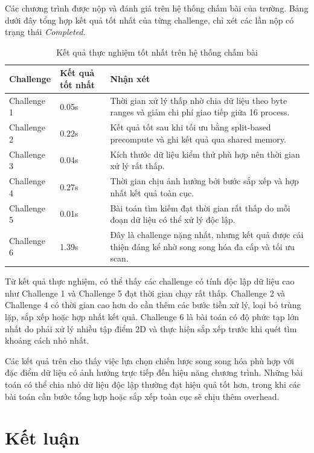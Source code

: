 \documentclass[12pt,a4paper]{article}
\begin{document}
Các chương trình được nộp và đánh giá trên hệ thống chấm bài của trường. Bảng dưới đây tổng hợp kết quả tốt nhất của từng challenge, chỉ xét các lần nộp có trạng thái \textit{Completed}.

\begin{table}[H]
\centering
\caption{Kết quả thực nghiệm tốt nhất trên hệ thống chấm bài}
\begin{tabularx}{\textwidth}{p{2.5cm}p{2.5cm}Y}
\toprule
\textbf{Challenge} & \textbf{Kết quả tốt nhất} & \textbf{Nhận xét} \\
\midrule
Challenge 1 & 0.05s & Thời gian xử lý thấp nhờ chia dữ liệu theo byte ranges và giảm chi phí giao tiếp giữa 16 process. \\
Challenge 2 & 0.22s & Kết quả tốt sau khi tối ưu bằng split-based precompute và ghi kết quả qua shared memory. \\
Challenge 3 & 0.04s & Kích thước dữ liệu kiểm thử phù hợp nên thời gian xử lý rất thấp. \\
Challenge 4 & 0.27s & Thời gian chịu ảnh hưởng bởi bước sắp xếp và hợp nhất kết quả toàn cục. \\
Challenge 5 & 0.01s & Bài toán tìm kiếm đạt thời gian rất thấp do mỗi đoạn dữ liệu có thể xử lý độc lập. \\
Challenge 6 & 1.39s & Đây là challenge nặng nhất, nhưng kết quả được cải thiện đáng kể nhờ song song hóa đa cấp và tối ưu scan. \\
\bottomrule
\end{tabularx}
\end{table}

Từ kết quả thực nghiệm, có thể thấy các challenge có tính độc lập dữ liệu cao như Challenge 1 và Challenge 5 đạt thời gian chạy rất thấp. Challenge 2 và Challenge 4 có thời gian cao hơn do cần thêm các bước tiền xử lý, loại bỏ trùng lặp, sắp xếp hoặc hợp nhất kết quả. Challenge 6 là bài toán có độ phức tạp lớn nhất do phải xử lý nhiều tập điểm 2D và thực hiện sắp xếp trước khi quét tìm khoảng cách nhỏ nhất.

Các kết quả trên cho thấy việc lựa chọn chiến lược song song hóa phù hợp với đặc điểm dữ liệu có ảnh hưởng trực tiếp đến hiệu năng chương trình. Những bài toán có thể chia nhỏ dữ liệu độc lập thường đạt hiệu quả tốt hơn, trong khi các bài toán cần bước tổng hợp hoặc sắp xếp toàn cục sẽ chịu thêm overhead.

\section{Kết luận}
\end{document}
